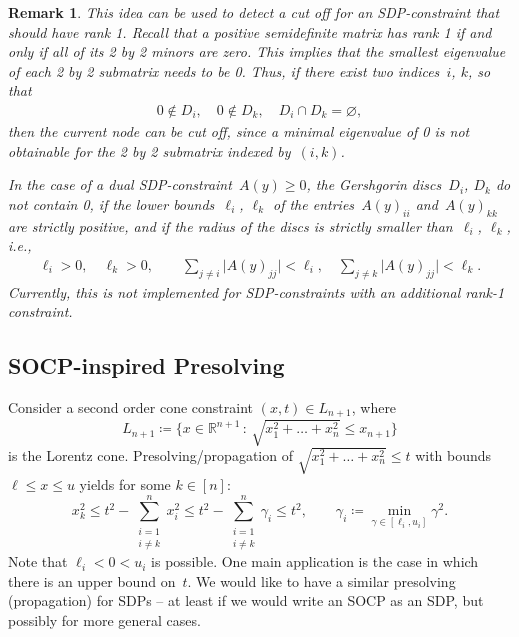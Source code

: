 \documentclass[10pt, a4paper]{article}
\newcommand{\suchthat}{\,:\,}
\newcommand{\abs}[1]{\lvert{#1}\rvert}
\newcommand{\define}{\coloneqq}
\newcommand{\R}{\mathds{R}}
\newtheorem{remark}[theorem]{Remark}
\begin{document}
\begin{remark}
  This idea can be used to detect a cut off for an SDP-constraint that
  should have rank 1. Recall that a positive semidefinite matrix has rank 1
  if and only if all of its 2 by 2 minors are zero. This implies that the
  smallest eigenvalue of each 2 by 2 submatrix needs to be 0. Thus, if
  there exist two indices~$i$, $k$, so that
  \begin{align*}
    0 \notin D_i,\quad 0 \notin D_k, \quad D_i \cap D_k = \varnothing,
  \end{align*}
  then the current node can be cut off, since a minimal eigenvalue of 0 is
  not obtainable for the 2 by 2 submatrix indexed by~$(i,k)$.

  In the case of a dual SDP-constraint~$A(y) \geq 0$, the Gershgorin
  discs~$D_i$, $D_k$ do not contain 0, if the lower bounds~$\ell_i$,
  $\ell_k$ of the entries~$A(y)_{ii}$ and~$A(y)_{kk}$ are strictly
  positive, and if the radius of the discs is strictly smaller
  than~$\ell_i$, $\ell_k$, i.e.,
  \begin{align*}
    \ell_i > 0,\quad \ell_k > 0, \qquad \sum_{j\neq i} \abs{A(y)_{jj}} <
    \ell_i, \quad \sum_{j\neq k} \abs{A(y)_{jj}} < \ell_k.
  \end{align*}
  Currently, this is not implemented for SDP-constraints with an additional
  rank-1 constraint.
\end{remark}



\subsection{SOCP-inspired Presolving}

Consider a second order cone constraint $(x,t) \in L_{n+1}$, where
\[
  L_{n+1} \define \Big\{x \in \R^{n+1} \suchthat \sqrt{x_1^2 + \dots + x_n^2}
  \leq x_{n+1}\Big\}
\]
is the Lorentz cone.  Presolving/propagation of
$\sqrt{x_1^2 + \dots + x_n^2} \leq t$ with bounds $\ell \leq x \leq u$
yields for some $k \in [n]$:
\begin{equation}\label{eq:SOCPpre}
  x_k^2 \leq t^2 - \sum_{\substack{i=1\\ i \neq k}}^n x_i^2 \leq t^2 -
  \sum_{\substack{i=1\\ i \neq k}}^n \gamma_i \leq t^2,\qquad
  \gamma_i \define \min_{\gamma \in [\ell_i, u_i]} \gamma^2.
\end{equation}
Note that $\ell_i < 0 < u_i$ is possible. One main application is the case
in which there is an upper bound on~$t$. We would like to have a similar
presolving (propagation) for SDPs -- at least if we would write an SOCP as
an SDP, but possibly for more general cases.
\end{document}
